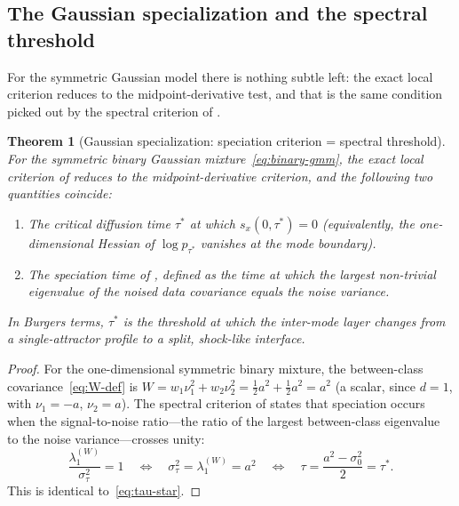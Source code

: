 \documentclass[11pt]{article}
\newtheorem{theorem}{Theorem}[section]
\begin{document}
\subsection{The Gaussian specialization and the spectral threshold}\label{sec:shocks:characteristics}

For the symmetric Gaussian model there is nothing subtle left: the exact local criterion reduces to the midpoint-derivative test, and that is the same condition picked out by the spectral criterion of \citet{biroli2024dynamical}.

\begin{theorem}[Gaussian specialization: speciation criterion = spectral threshold]\label{thm:shock-speciation}
For the symmetric binary Gaussian mixture~\eqref{eq:binary-gmm}, the exact local criterion of  reduces to the midpoint-derivative criterion, and the following two quantities coincide:
\begin{enumerate}[label=\textup{(\roman*)},nosep]
\item The critical diffusion time $\tau^\ast$ at which $s_x(0,\tau^\ast) = 0$ (equivalently, the one-dimensional Hessian of $\log p_{\tau^\ast}$ vanishes at the mode boundary).
\item The speciation time of \citet{biroli2024dynamical}, defined as the time at which the largest non-trivial eigenvalue of the noised data covariance equals the noise variance.
\end{enumerate}
In Burgers terms, $\tau^\ast$ is the threshold at which the inter-mode layer changes from a single-attractor profile to a split, shock-like interface.
\end{theorem}

\begin{proof}
For the one-dimensional symmetric binary mixture, the between-class covariance~\eqref{eq:W-def} is $W = w_1 \nu_1^2 + w_2 \nu_2^2 = \tfrac{1}{2}a^2 + \tfrac{1}{2}a^2 = a^2$ (a scalar, since $d=1$, with $\nu_1 = -a$, $\nu_2 = a$).
The spectral criterion of \citet{biroli2024dynamical} states that speciation occurs when the signal-to-noise ratio---the ratio of the largest between-class eigenvalue to the noise variance---crosses unity:
\begin{equation}\label{eq:biroli-criterion}
  \frac{\lambda_1^{(W)}}{\sigma_\tau^2} = 1
  \quad\Longleftrightarrow\quad
  \sigma_\tau^2 = \lambda_1^{(W)} = a^2
  \quad\Longleftrightarrow\quad
  \tau = \frac{a^2 - \sigma_0^2}{2} = \tau^\ast.
\end{equation}
This is identical to~\eqref{eq:tau-star}.
\end{proof}
\end{document}
